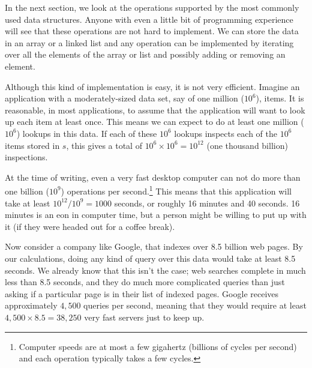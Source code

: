 In the next section, we look at the operations supported by the
most commonly used data structures.  Anyone with even a little bit of
programming experience will see that these operations are not hard to
implement.  We can store the data in an array or a linked list and any
operation can be implemented by iterating over all the elements of the
array or list and possibly adding or removing an element.

Although this kind of implementation is easy, it is not very efficient.
Imagine an application with a moderately-sized data set, say of one
million ($10^6$), items.  It is reasonable, in most applications, to
assume that the application will want to look up each item at least once.
This means we can expect to do at least one million ($10^6$) lookups in
this data.  If each of these $10^6$ lookups inspects  each of the $10^6$
items stored in $s$, this gives a total of $10^6\times 10^6=10^{12}$
(one thousand billion) inspections.

At the time of writing, even a very fast desktop computer can not do more
than one billion ($10^9$) operations per second.\footnote{Computer speeds
are at most a few gigahertz (billions of cycles per second) and each
operation typically takes a few cycles.} This means that this application
will take at least $10^{12}/10^9 = 1000$ seconds, or roughly 16 minutes
and 40 seconds.  16 minutes is an eon in computer time, but a person might
be willing to put up with it (if they were headed out for a coffee break).


Now consider a company like Google, that indexes over 8.5 billion
web pages.  By our calculations, doing any kind of query over this data
would take at least 8.5 seconds.  We already know that this isn't the
case; web searches complete in much less than 8.5 seconds, and they do
much more complicated queries than just asking if a particular page is
in their list of indexed pages.  Google receives approximately $4,500$
queries per second, meaning that they would require at least $4,500\times
8.5=38,250$ very fast servers just to keep up.


